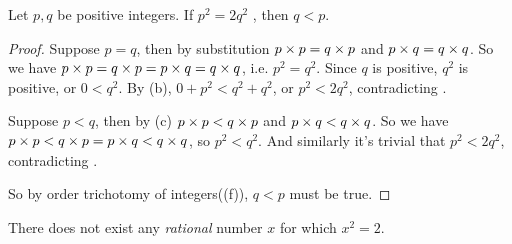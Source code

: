 \begin{additional corollary} \label{ac 4.4.3}
Let \(p, q\) be positive integers.
If \(p^2 = 2q^2\) , then \(q < p\). 
\end{additional corollary}

\begin{proof}
Suppose \(p = q\), then by substitution  \(p \times p = q \times p\) and \(p \times q = q \times q\).
So we have \(p \times p = q \times p = p \times q = q \times q\), i.e. \(p^2 = q^2\).
Since \(q\) is positive, \(q^2\) is positive, or \(0 < q^2\).
By (b), \(0 + p^2 < q^2 + q^2\), or \(p^2 < 2q^2\), contradicting .

Suppose \(p < q\), then by (c) \(p \times p < q \times p\) and \(p \times q < q \times q\).
So we have \(p \times p < q \times p = p \times q < q \times q\), so \(p^2 < q^2\).
And similarly it's trivial that \(p^2 < 2q^2\), contradicting .

So by order trichotomy of integers((f)), \(q < p\) must be true.
\end{proof}

\begin{proposition} \label{prop 4.4.4}
There does not exist any \emph{rational} number \(x\) for which \(x^2 = 2\).
\end{proposition}

